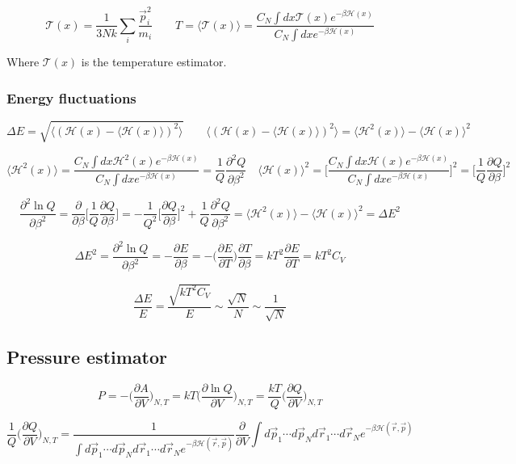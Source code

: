 	$$\mathcal{T}(x) = \frac{1}{3Nk}\sum\limits_i\frac{\vec{p}_i^2}{m_i}\qquad T = \langle\mathcal{T}(x)\rangle = \frac{C_N\int dx\mathcal{T}(x)e^{-\beta\mathcal{H}(x)}}{C_N\int dx e^{-\beta\mathcal{H}(x)}}$$

	Where $\mathcal{T}(x)$ is the temperature estimator.

		\subsubsection{Energy fluctuations}

		$$\Delta E = \sqrt{\langle(\mathcal{H}(x)-\langle\mathcal{H}(x)\rangle)^2\rangle}\qquad \langle(\mathcal{H}(x)-\langle\mathcal{H}(x)\rangle)^2\rangle = \langle\mathcal{H}^2(x)\rangle - \langle\mathcal{H}(x)\rangle^2$$

		$$\langle\mathcal{H}^2(x)\rangle = \frac{C_N\int dx\mathcal{H}^2(x)e^{-\beta\mathcal{H}(x)}}{C_N\int dxe^{-\beta\mathcal{H}(x)}} = \frac{1}{Q}\frac{\partial^2 Q}{\partial \beta^2}\quad\langle\mathcal{H}(x)\rangle^2 = \biggl[\frac{C_N\int dx\mathcal{H}(x)e^{-\beta\mathcal{H}(x)}}{C_N\int dx e^{-\beta\mathcal{H}(x)}}\biggr]^2 = \biggl[\frac{1}{Q}\frac{\partial Q}{\partial\beta}\biggr]^2$$

		$$\frac{\partial^2\ln Q}{\partial \beta^2} = \frac{\partial}{\partial\beta}\biggl[\frac{1}{Q}\frac{\partial Q}{\partial\beta}\biggr] = -\frac{1}{Q^2}\biggl[\frac{\partial Q}{\partial\beta}\biggr]^2 + \frac{1}{Q}\frac{\partial^2 Q}{\partial\beta^2} = \langle\mathcal{H}^2(x)\rangle-\langle\mathcal{H}(x)\rangle^2 = \Delta E^2$$

		$$\Delta E^2 = \frac{\partial^2\ln Q}{\partial\beta^2} = -\frac{\partial E}{\partial\beta} = -\biggl(\frac{\partial E}{\partial T}\biggr)\frac{\partial T}{\partial\beta} = kT^2\frac{\partial E}{\partial T} = kT^2C_V$$

		$$\frac{\Delta E}{E} = \frac{\sqrt{kT^2C_V}}{E}\sim\frac{\sqrt{N}}{N}\sim\frac{1}{\sqrt{N}}$$

	\subsection{Pressure estimator}

	$$P = -\biggl(\frac{\partial A}{\partial V}\biggr)_{N, T} = kT\biggl(\frac{\partial \ln Q}{\partial V}\biggr)_{N, T} = \frac{kT}{Q}\biggl(\frac{\partial Q}{\partial V}\biggr)_{N, T}$$

	$$\frac{1}{Q}\biggl(\frac{\partial Q}{\partial V}\biggr)_{N, T} = \frac{1}{\int d\vec{p}_1\cdots d\vec{p}_Nd\vec{r}_1\cdots d\vec{r}_Ne^{-\beta\mathcal{H}(\vec{r},\vec{p})}}\frac{\partial}{\partial V}\int d\vec{p}_1\cdots d\vec{p}_Nd\vec{r}_1\cdots d\vec{r}_N e^{-\beta\mathcal{H}(\vec{r},\vec{p})}$$


